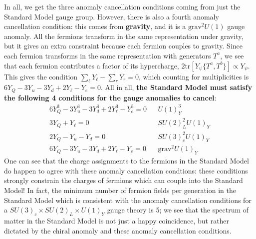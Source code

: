 \documentclass[11pt, oneside]{article}   	%
\theoremstyle{definition}
\numberwithin{equation}{subsection}		%
\begin{document}
In all, we get the three anomaly cancellation conditions coming from just the Standard Model gauge group. However, there is also a fourth anomaly cancellation 
condition: this comes from \textbf{gravity}, and it is a $\mathrm{grav}^2 U(1)$ gauge anomaly. All the fermions transform in the same representation under gravity, 
but it gives an extra constraint because each fermion couples to gravity. Since each fermion transforms in the same representation with generators $T^a$, we 
see that each fermion contributes a factor of its hypercharge, $2\mathrm{tr}[Y_\psi\{T^a, T^b\}]\propto Y_\psi$. This gives the condition $\sum_\ell Y_\ell - \sum_r 
Y_r = 0$, which counting for multiplicities is $6 Y_Q - 3 Y_u - 3 Y_d + 2 Y_\ell - Y_e = 0$. All in all, \textbf{the Standard Model must satisfy the following 4 conditions 
for the gauge anomalies to cancel}:
\begin{align}
	6 Y_Q^3 - 3 Y_u^3 - 3 Y_d^3 + 2 Y_\ell^3 - Y_e^3 = 0 && U(1)_Y^3 \\
	3 Y_Q + Y_\ell = 0 && SU(2)_L^2 U(1)_Y \\
	2 Y_Q - Y_u - Y_d = 0 && SU(3)_c^2 U(1)_Y \\
	6 Y_Q - 3 Y_u - 3 Y_d + 2 Y_\ell - Y_e = 0 && \mathrm{grav}^2 U(1)_Y
\end{align}
One can see that the charge assignments to the fermions in the Standard Model do happen to agree with these anomaly cancellation condtions: these 
conditions strongly constrain the charges of fermions which can couple into the Standard Model! In fact, the minimum number of fermion fields per generation 
in the Standard Model which is consistent with the anomaly cancellation conditions for a $SU(3)_c\times SU(2)_L\times U(1)_Y$ gauge theory is 5; we see that 
the spectrum of matter in the Standard Model is not just a happy coincidence, but rather dictated by the chiral anomaly and these anomaly 
cancellation conditions.
\end{document}
